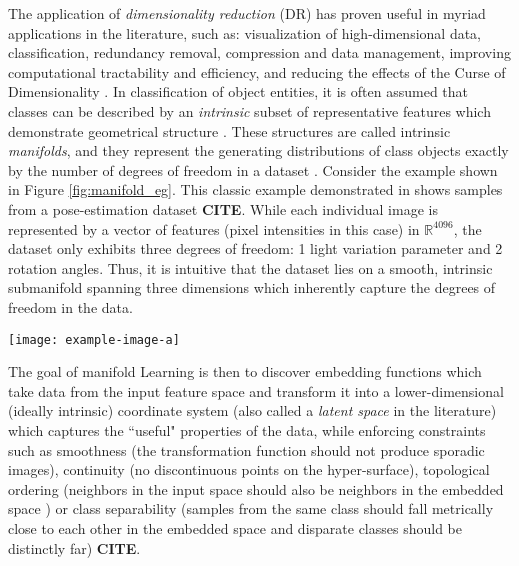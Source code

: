 The application of \textit{dimensionality reduction} (DR) has proven useful in myriad applications in the literature, such as: visualization of high-dimensional data, classification, redundancy removal, compression and data management, improving computational tractability and efficiency, and reducing the effects of the Curse of Dimensionality \cite{Bishop1998GTM,Nickel2017PoincareEmbeddings,Talmon2015ManifoldLearningInDynamicalSystems,Tenenbaum2000Isomap, Geng2005SupNonlinearDimRed, Palomo2017GHNG, Kohonen1990SOM,Kegl2008PrincipalManifoldsTextbook,Bengio2014RepLearningReview}.  In classification of object entities, it is often assumed that classes can be described by an \textit{intrinsic} subset of representative features which demonstrate geometrical structure \cite{Belkin2006ManReg}. These structures are called intrinsic \textit{manifolds}, and they represent the generating distributions of class objects exactly by the number of degrees of freedom in a dataset \cite{Thorstensen2009ManifoldThesis, Belkin2004SemiSupLearningRiemannianManifolds}.     Consider the example shown in Figure \ref{fig:manifold_eg}.  This classic example demonstrated in \cite{Thorstensen2009ManifoldThesis} shows samples from a pose-estimation dataset \textbf{CITE}.  While each individual image is represented by a vector of features (pixel intensities in this case) in $\mathbb{R}^{4096}$, the dataset only exhibits three degrees of freedom: 1 light variation parameter and 2 rotation angles.  Thus, it is intuitive that the dataset lies on a smooth, intrinsic submanifold spanning three dimensions which inherently capture the degrees of freedom in the data.

\begin{center}
	\begin{figure*}[h]
		\centering
		\texttt{[image: example-image-a]}
		\caption[Example pose data manifold.]{Placeholder for example of high D data lying on a low-dimensional sub-manifold.}
		\label{fig:manifold_eg}
	\end{figure*}
\end{center}

The goal of manifold Learning is then to discover embedding functions which take data from the input feature space and transform it into a lower-dimensional (ideally intrinsic) coordinate system (also called a \textit{latent space} in the literature) which captures the ``useful" properties of the data, while enforcing constraints such as smoothness (the transformation function should not produce sporadic images), continuity (no discontinuous points on the hyper-surface), topological ordering (neighbors in the input space should also be neighbors in the embedded space ) or class separability (samples from the same class should fall metrically close to each other in the embedded space and disparate classes should be distinctly far) \textbf{CITE}.


